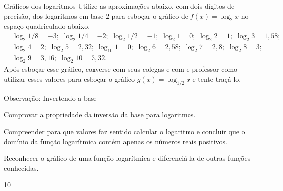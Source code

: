 \begin{task}{Gráficos dos logaritmos}
Utilize as aproximações abaixo, com dois dígitos de precisão, dos logaritmos em base $2$ para esboçar o gráfico de $f(x) = \log_{2} x$ no espaço quadriculado abaixo.
\begin{align*}
& \log_{2} 1/8 = -3; \,\, \log_{2} 1/4 = -2; \,\, \log_{2} 1/2 = -1; \,\, \log_{2} 1 = 0; \,\, \log_{2} 2  = 1; \,\, \log_{2} 3  =  1{,}58; \,\,\\
& \log_{2} 4  = 2; \,\, \log_{2} 5 = 2{,}32; \,\, \log_{10} 1 = 0; \,\, \log_{2} 6 = 2{,}58; \,\, \log_{2} 7  = 2{,}8; \,\, \log_{2} 8  = 3; \,\,\\
& \log_{2} 9  = 3{,}16; \,\, \log_{2} 10  = 3{,}32.
\end{align*}
Após esboçar esse gráfico, converse com seus colegas e com o professor como utilizar esses valores para esboçar o gráfico $g(x) = \log_{1/2} x$ e tente traçá-lo.

\begin{figure}[H]
\centering

\end{figure}
\end{task}
\clearpage
\begin{objectives}{Observação: Invertendo a base}
{
	Comprovar a propriedade da inversão da base para logaritmos.


	Compreender para que valores faz sentido calcular o logaritmo e concluir que o domínio da função logarítmica contém apenas os números reais positivos.


	Reconhecer o gráfico de uma função logarítmica e diferenciá-la de outras funções conhecidas.
}{1}{0}
\end{objectives}
